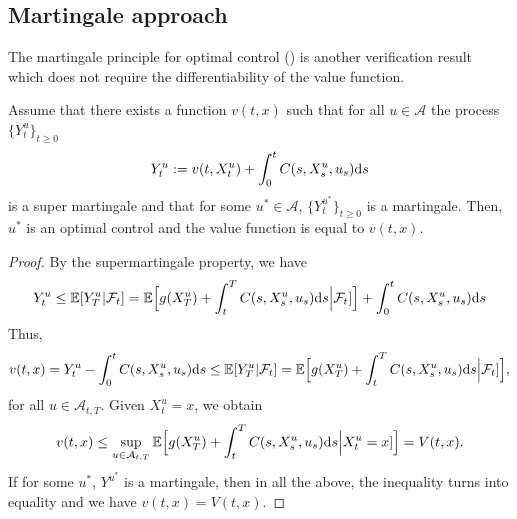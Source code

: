 \documentclass[11pt]{book}
\newcommand{\ds}{\text{\normalfont d}s}
\newcommand{\dW}{\text{\normalfont d}W}
\begin{document}
\subsection{Martingale approach}\label{sec:martingale}
The martingale principle for optimal control (\cite{DV73}) is another verification result which does not require the differentiability of the value function.
\begin{thm}\label{thm:martingale_verification}
	Assume that there exists a function $v(t,x)$ such that for all $u\in\mathcal{A}$ the process $\{Y^u_t\}_{t\ge0}$
	\begin{equation}
		Y^u_t:=v(t,X_t^u)+\int_0^tC(s,X_s^u,u_s){{\ds}}
	\end{equation}
	is a super martingale and that for some $u^*\in\mathcal{A}$, $\{Y^{u^*}_t\}_{t\ge0}$ is a martingale. Then, $u^*$ is an optimal control and the value function is equal to $v(t,x)$.
\end{thm}
\begin{proof}
By the supermartingale property, we have
\begin{equation}
Y^u_t\le\mathbb{E}[Y^u_T|\mathcal{F}_t]=\mathbb{E}\Big[g(X_T^u)+\int_t^TC(s,X_s^u,u_s){{\ds}}\Big|\mathcal{F}_t]\Big]+\int_0^tC(s,X_s^u,u_s){{\ds}}
\end{equation}
Thus, 
\begin{equation}
v(t,x)=Y^u_t-\int_0^tC(s,X_s^u,u_s){{\ds}}\le\mathbb{E}[Y^u_T|\mathcal{F}_t]=\mathbb{E}\Big[g(X_T^u)+\int_t^TC(s,X_s^u,u_s){{\ds}}\Big|\mathcal{F}_t]\Big],
\end{equation}
for all $u\in\mathcal{A}_{t,T}$. Given $X_t^u=x$, we obtain
\begin{equation}
v(t,x)\le\sup_{u\in\mathcal{A}_{t,T}}\mathbb{E}\Big[g(X_T^u)+\int_t^TC(s,X_s^u,u_s){{\ds}}\Big|X_t^u=x]\Big]=V(t,x).
\end{equation}
If for some $u^*$, $Y^{u^*}$ is a martingale, then in all the above, the inequality turns into equality and we have $v(t,x)=V(t,x)$.
\end{proof}
\end{document}

